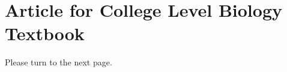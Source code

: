 \section{Article for College Level Biology Textbook}
Please turn to the next page.
\newpage

\newpage